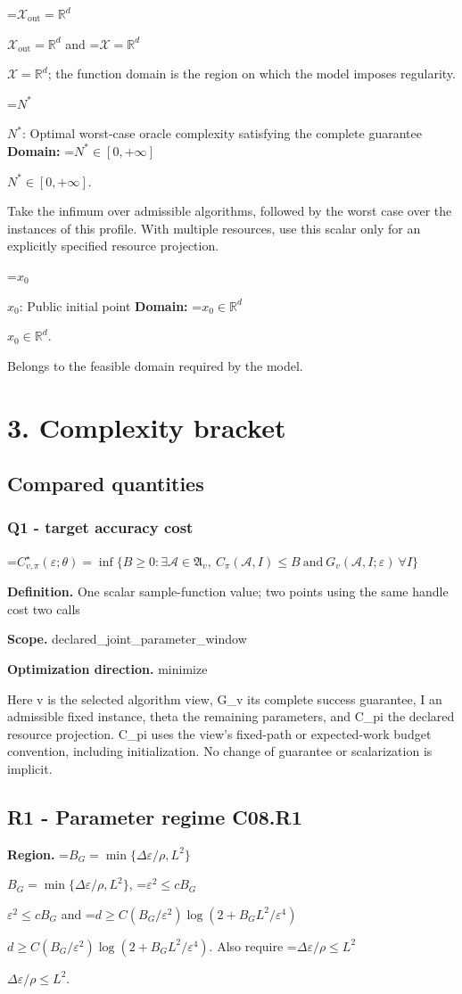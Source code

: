 \documentclass[10pt,a4paper]{article}
\newcommand{\AtlasMath}[1]{\par\begingroup\centering\setbox0=\hbox{$\displaystyle #1$}\ifdim\wd0>1.4\linewidth\typeout{ATLAS WIDE FORMULA: \the\wd0}\fi\ifdim\wd0>\linewidth\resizebox{\linewidth}{!}{\box0}\else\box0\fi\par\endgroup}
\newcommand{\AtlasInlineMath}[1]{\begingroup\setbox0=\hbox{$#1$}\ifdim\wd0>.4\linewidth\endgroup\AtlasMath{#1}\else\endgroup$#1$\fi}
\begin{document}
\AtlasInlineMath{\mathcal{X}_{\mathrm{out}}=\mathbb{R}^d} and \AtlasInlineMath{\mathcal{X}=\mathbb{R}^d}; the function domain is the region on which the model imposes regularity.

\AtlasInlineMath{N^*}: Optimal worst-case oracle complexity satisfying the complete guarantee \textbf{Domain:} \AtlasInlineMath{N^*\in[0,+\infty]}.

Take the infimum over admissible algorithms, followed by the worst case over the instances of this profile. With multiple resources, use this scalar only for an explicitly specified resource projection.

\AtlasInlineMath{x_0}: Public initial point \textbf{Domain:} \AtlasInlineMath{x_0\in\mathbb{R}^d}.

Belongs to the feasible domain required by the model.

\section{3. Complexity bracket}
\subsection{Compared quantities}
\subsubsection{Q1 - target accuracy cost}
\AtlasMath{C^\star_{v,\pi}(\varepsilon;\theta)=\inf\{B\ge0:\exists\mathcal A\in\mathfrak A_v,\ C_\pi(\mathcal A,I)\le B\ \text{and}\ G_v(\mathcal A,I;\varepsilon)\ \forall I\}}
\textbf{Definition.} One scalar sample-function value; two points using the same handle cost two calls

\textbf{Scope.} declared\_joint\_parameter\_window

\textbf{Optimization direction.} minimize

Here v is the selected algorithm view, G\_v its complete success guarantee, I an admissible fixed instance, theta the remaining parameters, and C\_pi the declared resource projection. C\_pi uses the view's fixed-path or expected-work budget convention, including initialization. No change of guarantee or scalarization is implicit.

\subsection{R1 - Parameter regime C08.R1}
\textbf{Region.} \AtlasInlineMath{B_G=\min\{\Delta\varepsilon/\rho,L^2\}}, \AtlasInlineMath{\varepsilon^2\le cB_G} and \AtlasInlineMath{d\ge C(B_G/\varepsilon^2)\log(2+B_GL^2/\varepsilon^4)}. Also require \AtlasInlineMath{\Delta\varepsilon/\rho\le L^2}.
\end{document}
